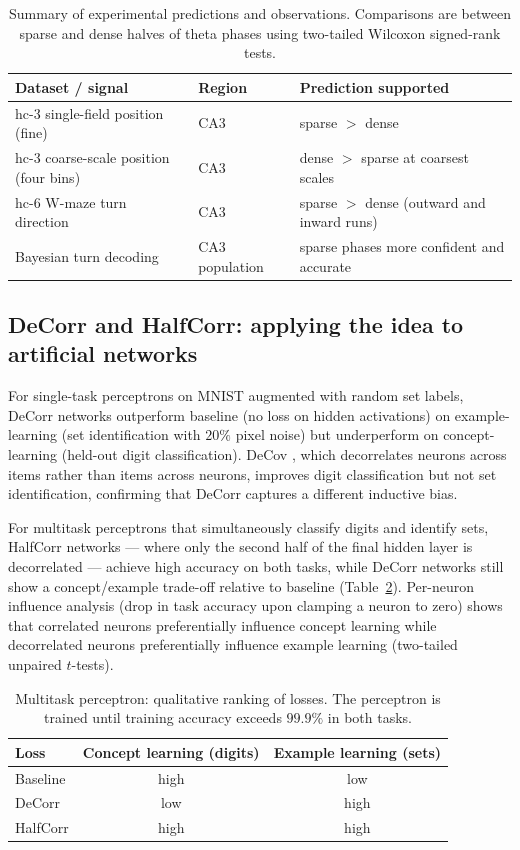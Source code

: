 \documentclass[11pt]{article}
\begin{document}
\begin{table}[h]
\centering
\caption{Summary of experimental predictions and observations. Comparisons are between sparse and dense halves of theta phases using two-tailed Wilcoxon signed-rank tests.}
\label{tab:expt}
\begin{tabular}{lll}
\toprule
Dataset / signal & Region & Prediction supported \\
\midrule
hc-3 single-field position (fine) & CA3 & sparse $>$ dense \\
hc-3 coarse-scale position (four bins) & CA3 & dense $>$ sparse at coarsest scales \\
hc-6 W-maze turn direction & CA3 & sparse $>$ dense (outward and inward runs) \\
Bayesian turn decoding & CA3 population & sparse phases more confident and accurate \\
\bottomrule
\end{tabular}
\end{table}

\subsection{DeCorr and HalfCorr: applying the idea to artificial networks}
For single-task perceptrons on MNIST augmented with random set labels, DeCorr networks outperform baseline (no loss on hidden activations) on example-learning (set identification with $20\%$ pixel noise) but underperform on concept-learning (held-out digit classification). DeCov \cite{cogswell2015decov}, which decorrelates neurons across items rather than items across neurons, improves digit classification but not set identification, confirming that DeCorr captures a different inductive bias.

For multitask perceptrons that simultaneously classify digits and identify sets, HalfCorr networks --- where only the second half of the final hidden layer is decorrelated --- achieve high accuracy on both tasks, while DeCorr networks still show a concept/example trade-off relative to baseline (Table~\ref{tab:multitask}). Per-neuron influence analysis (drop in task accuracy upon clamping a neuron to zero) shows that correlated neurons preferentially influence concept learning while decorrelated neurons preferentially influence example learning (two-tailed unpaired $t$-tests).

\begin{table}[h]
\centering
\caption{Multitask perceptron: qualitative ranking of losses. The perceptron is trained until training accuracy exceeds $99.9\%$ in both tasks.}
\label{tab:multitask}
\begin{tabular}{lcc}
\toprule
Loss & Concept learning (digits) & Example learning (sets) \\
\midrule
Baseline & high & low \\
DeCorr & low & high \\
HalfCorr & high & high \\
\bottomrule
\end{tabular}
\end{table}
\end{document}
